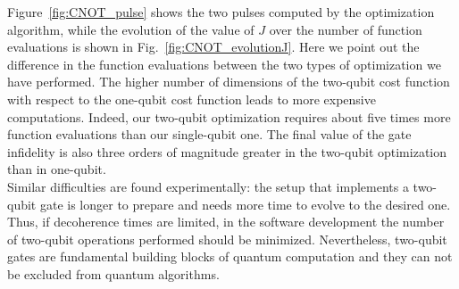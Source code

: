 \documentclass[../main/main.tex]{subfiles}
\begin{document}
\vspace{0.5cm}
Figure~\ref{fig:CNOT_pulse} shows the two pulses computed by the optimization algorithm, while the evolution of the value of $J$ over the number of function evaluations is shown in Fig.~\ref{fig:CNOT_evolutionJ}. Here we point out the difference in the function evaluations between the two types of optimization we have performed. The higher number of dimensions of the two-qubit cost function with respect to the one-qubit cost function leads to more expensive computations. Indeed, our two-qubit optimization requires about five times more function evaluations than our single-qubit one. The final value of the gate infidelity is also three orders of magnitude greater in the two-qubit optimization than in one-qubit.\\
Similar difficulties are found experimentally: the setup that implements a two-qubit gate is longer to prepare and needs more time to evolve to the desired one. Thus, if decoherence times are limited, in the software development the number of two-qubit operations performed should be minimized. Nevertheless, two-qubit gates are fundamental building blocks of quantum computation and they can not be excluded from quantum algorithms.
\end{document}
